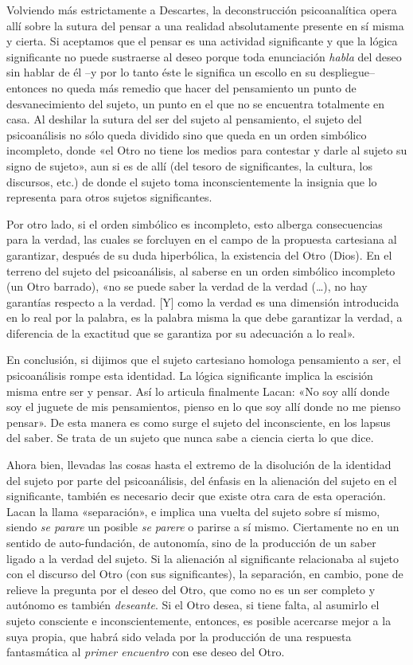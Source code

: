 Volviendo más estrictamente a Descartes, la deconstrucción psicoanalítica opera allí sobre la sutura del pensar a una realidad absolutamente presente en sí misma y cierta. Si aceptamos que el pensar es una actividad significante y que la lógica significante no puede sustraerse al deseo porque toda enunciación \emph{habla} del deseo sin hablar de él --y por lo tanto éste le significa un escollo en su despliegue-- entonces no queda más remedio que hacer del pensamiento un punto de desvanecimiento del sujeto, un punto en el que no se encuentra totalmente en casa. Al deshilar la sutura del ser del sujeto al pensamiento, el sujeto del psicoanálisis no sólo queda dividido sino que queda en un orden simbólico incompleto, donde «el Otro no tiene los medios para contestar y darle al sujeto su signo de sujeto», aun si es de allí (del tesoro de significantes, la cultura, los discursos, etc.) de donde el sujeto toma inconscientemente la insignia que lo representa para otros sujetos significantes.

Por otro lado, si el orden simbólico es incompleto, esto alberga consecuencias para la verdad, las cuales se forcluyen en el campo de la propuesta cartesiana al garantizar, después de su duda hiperbólica, la existencia del Otro (Dios). En el terreno del sujeto del psicoanálisis, al saberse en un orden simbólico incompleto (un Otro barrado), «no se puede saber la verdad de la verdad (\ldots), no hay garantías respecto a la verdad. {[}Y{]} como la verdad es una dimensión introducida en lo real por la palabra, es la palabra misma la que debe garantizar la verdad, a diferencia de la exactitud que se garantiza por su adecuación a lo real».

En conclusión, si dijimos que el sujeto cartesiano homologa pensamiento a ser, el psicoanálisis rompe esta identidad. La lógica significante implica la escisión misma entre ser y pensar. Así lo articula finalmente Lacan: «No soy allí donde soy el juguete de mis pensamientos, pienso en lo que soy allí donde no me pienso pensar». De esta manera es como surge el sujeto del inconsciente, en los lapsus del saber. Se trata de un sujeto que nunca sabe a ciencia cierta lo que dice.

Ahora bien, llevadas las cosas hasta el extremo de la disolución de la identidad del sujeto por parte del psicoanálisis, del énfasis en la alienación del sujeto en el significante, también es necesario decir que existe otra cara de esta operación. Lacan la llama «separación», e implica una vuelta del sujeto sobre sí mismo, siendo \emph{se parare} un posible \emph{se parere} o parirse a sí mismo. Ciertamente no en un sentido de auto-fundación, de autonomía, sino de la producción de un saber ligado a la verdad del sujeto. Si la alienación al significante relacionaba al sujeto con el discurso del Otro (con sus significantes), la separación, en cambio, pone de relieve la pregunta por el deseo del Otro, que como no es un ser completo y autónomo es también \emph{deseante}. Si el Otro desea, si tiene falta, al asumirlo el sujeto consciente e inconscientemente, entonces, es posible acercarse mejor a la suya propia, que habrá sido velada por la producción de una respuesta fantasmática al \emph{primer encuentro} con ese deseo del Otro.

